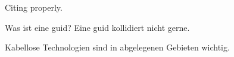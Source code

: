 \lipsum[4] Citing properly.

Was ist eine \gls{guid}?
Eine \gls{guid} kollidiert nicht gerne.

Kabellose Technologien sind in abgelegenen Gebieten wichtig.

